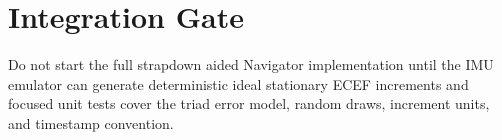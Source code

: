\section{Integration Gate}

\begin{implbox}
Do not start the full strapdown aided Navigator implementation until the IMU
emulator can generate deterministic ideal stationary ECEF increments and
focused unit tests cover the triad error model, random draws, increment units,
and timestamp convention.
\end{implbox}
